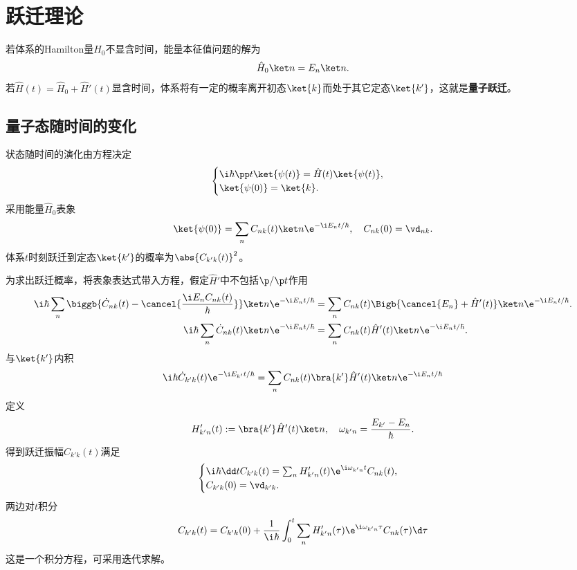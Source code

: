 \chapter{跃迁理论}
若体系的Hamilton量$\hat H_0$不显含时间，能量本征值问题的解为
\[
	\hat H_0\ket n=E_n\ket n.
\]
若$\hat H(t)=\hat H_0+\hat H'(t)$显含时间，体系将有一定的概率离开初态$\ket{k}$而处于其它定态$\ket{k'}$，这就是\textbf{量子跃迁}。
\section{量子态随时间的变化}
状态随时间的演化由\Schr 方程决定
\begin{align}
	\begin{cases}
		\i\hbar\pp t\ket{\psi(t)}=\hat H(t)\ket{\psi(t)},\\
		\ket{\psi(0)}=\ket{k}.
	\end{cases}
\end{align}
采用能量$\hat H_0$表象 
\begin{align}
	\ket{\psi(0)}=\sum_n C_{nk}(t)\ket n\e^{-\i E_nt/\hbar},\quad C_{nk}(0)=\vd_{nk}.
\end{align}
体系$t$时刻跃迁到定态$\ket{k'}$的概率为$\abs{C_{k'k}(t)}^2$。

为求出跃迁概率，将表象表达式带入\Schr 方程，假定$\hat H'$中不包括$\p/\p t$作用
\begin{align}\notag
	\i\hbar\sum_n\biggb{\dot C_{nk}(t)-\cancel{\frac{\i E_nC_{nk}(t)}\hbar}}\ket n\e^{-\i E_nt/\hbar}&=\sum_nC_{nk}(t)\Bigb{\cancel{E_n}+\hat H'(t)}\ket n\e^{-\i E_nt/\hbar}.\\
	\i\hbar\sum_n\dot C_{nk}(t)\ket n\e^{-\i E_nt/\hbar}&=\sum_nC_{nk}(t)\hat H'(t)\ket n\e^{-\i E_nt/\hbar}.
\end{align}
与$\ket{k'}$内积
\begin{align}
	\i\hbar\dot C_{k'k}(t)\e^{-\i E_{k'}t/\hbar}=\sum_nC_{nk}(t)\bra{k'}\hat H'(t)\ket n\e^{-\i E_nt/\hbar}
\end{align}
定义 
\begin{align}
	H_{k'n}'(t):=\bra{k'}\hat H'(t)\ket n,\quad\omega_{k'n}=\frac{E_{k'}-E_n}\hbar.
\end{align}
得到跃迁振幅$C_{k'k}(t)$满足 
\begin{align}
	\begin{cases}
		\i\hbar\dd tC_{k'k}(t)=\sum_nH'_{k'n}(t)\e^{\i\omega_{k'n}t}C_{nk}(t),\\
		C_{k'k}(0)=\vd_{k'k}.
	\end{cases}
\end{align}
两边对$t$积分
\begin{align}
	C_{k'k}(t)=C_{k'k}(0)+\frac1{\i\hbar}\int_0^t\sum_nH'_{k'n}(\tau)\e^{\i\omega_{k'n}\tau}C_{nk}(\tau)\d\tau
\end{align}
这是一个积分方程，可采用迭代求解。

